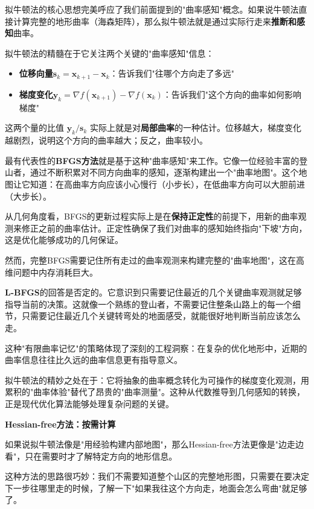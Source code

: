 拟牛顿法的核心思想完美呼应了我们前面提到的"曲率感知"概念。如果说牛顿法直接计算完整的地形曲率（海森矩阵），那么拟牛顿法就是通过实际行走来\textbf{推断和感知}曲率。

拟牛顿法的精髓在于它关注两个关键的"曲率感知"信息：
\begin{itemize}
\item \textbf{位移向量}$\mathbf{s}_k = \mathbf{x}_{k+1} - \mathbf{x}_k$：告诉我们"往哪个方向走了多远"
\item \textbf{梯度变化}$\mathbf{y}_k = \nabla f(\mathbf{x}_{k+1}) - \nabla f(\mathbf{x}_k)$：告诉我们"这个方向的曲率如何影响梯度"
\end{itemize}

这两个量的比值 $\mathbf{y}_k/\mathbf{s}_k$ 实际上就是对\textbf{局部曲率}的一种估计。位移越大，梯度变化越剧烈，说明这个方向的曲率越大；反之，曲率较小。

最有代表性的\textbf{BFGS方法}就是基于这种"曲率感知"来工作。它像一位经验丰富的登山者，通过不断积累对不同方向曲率的感知，逐渐构建出一个"曲率地图"。这个地图让它知道：在高曲率方向应该小心慢行（小步长），在低曲率方向可以大胆前进（大步长）。

从几何角度看，BFGS的更新过程实际上是在\textbf{保持正定性}的前提下，用新的曲率观测来修正之前的曲率估计。正定性确保了我们对曲率的感知始终指向"下坡"方向，这是优化能够成功的几何保证。

然而，完整BFGS需要记住所有走过的曲率观测来构建完整的"曲率地图"，这在高维问题中内存消耗巨大。

\textbf{L-BFGS}的回答是否定的。它意识到只需要记住最近的几个关键曲率观测就足够指导当前的决策。这就像一个熟练的登山者，不需要记住整条山路上的每一个细节，只需要记住最近几个关键转弯处的地面感受，就能很好地判断当前应该怎么走。

这种"有限曲率记忆"的策略体现了深刻的工程洞察：在复杂的优化地形中，近期的曲率信息往往比久远的曲率信息更有指导意义。

拟牛顿法的精妙之处在于：它将抽象的曲率概念转化为可操作的梯度变化观测，用累积的"曲率体验"替代了昂贵的"曲率测量"。这种从代数推导到几何感知的转换，正是现代优化算法能够处理复杂问题的关键。

\textbf{Hessian-free方法：按需计算}

如果说拟牛顿法像是"用经验构建内部地图"，那么Hessian-free方法更像是"边走边看"，只在需要时才了解特定方向的地形信息。

这种方法的思路很巧妙：我们不需要知道整个山区的完整地形图，只需要在要决定下一步往哪里走的时候，了解一下"如果我往这个方向走，地面会怎么弯曲"就足够了。


